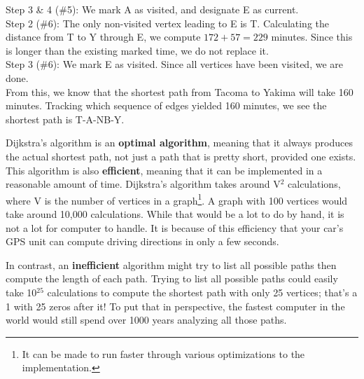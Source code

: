 \begin{example}{}{}
\noindent Step 3 \& 4 (\#5):  We mark A as visited, and designate E as current.\\

\noindent Step 2 (\#6):  The only non-visited vertex leading to E is T.  Calculating the distance from T to Y through E, we compute $172+57 = 229$ minutes.  Since this is longer than the existing marked time, we do not replace it.  \\

\noindent Step 3 (\#6):  We mark E as visited.  Since all vertices have been visited, we are done.  \\

From this, we know that the shortest path from Tacoma to Yakima will take 160 minutes.  Tracking which sequence of edges yielded 160 minutes, we see the shortest path is T-A-NB-Y. 
\end{example}

Dijkstra's algorithm is an \textbf{optimal algorithm}, meaning that it always produces the actual shortest path, not just a path that is pretty short, provided one exists.  This algorithm is also \textbf{efficient}, meaning that it can be implemented in a reasonable amount of time.  Dijkstra's algorithm takes around V$^2$ calculations, where V is the number of vertices in a graph\footnote{It can be made to run faster through various optimizations to the implementation.}.  A graph with 100 vertices would take around 10,000 calculations.  While that would be a lot to do by hand, it is not a lot for computer to handle.  It is because of this efficiency that your car's GPS unit can compute driving directions in only a few seconds.  
 
In contrast, an \textbf{inefficient} algorithm might try to list all possible paths then compute the length of each path.  Trying to list all possible paths could easily take 10$^25$ calculations to compute the shortest path with only 25 vertices; that's a 1 with 25 zeros after it!  To put that in perspective, the fastest computer in the world would still spend over 1000 years analyzing all those paths.


